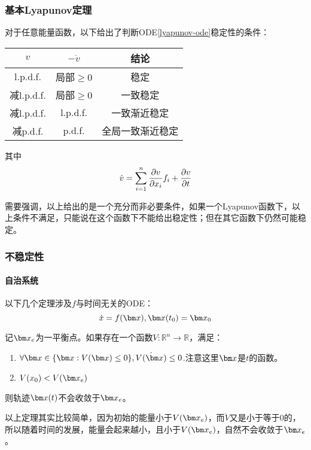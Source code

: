 \subsubsection{基本Lyapunov定理}
\begin{theorem}[基本Lyapunov定理]
对于任意能量函数，以下给出了判断ODE\eqref{lyapunov-ode}稳定性的条件：
\begin{longtable}{|c|c|c|}
\hline
$v$ & $-\dot{v}$ & \textbf{结论}\\
\hline
l.p.d.f. & 局部$\geq 0$ &稳定\\
减l.p.d.f. & 局部$\geq 0$ & 一致稳定\\
减l.p.d.f. & l.p.d.f. & 一致渐近稳定\\
减p.d.f. & p.d.f. &全局一致渐近稳定\\
\hline 
\end{longtable}

其中
$$\dot{v}=\sum_{i=1}^n\pdv{v}{x_i}f_i+\pdv{v}{t}$$

需要强调，以上给出的是一个充分而非必要条件，如果一个Lyapunov函数下，以上条件不满足，只能说在这个函数下不能给出稳定性；但在其它函数下仍然可能稳定。
\end{theorem}

\subsubsection{不稳定性}
\paragraph*{自治系统}以下几个定理涉及$f$与时间无关的ODE：
\begin{equation}
\dot{x}=f(\bx),\bx(t_0)=\bx_0
\end{equation}

\begin{theorem}[Lyapunov不稳定性定理]
记$\bx_e$为一平衡点。如果存在一个函数$V:\mathbb{R}^n\rightarrow \mathbb{R}$，满足：
\begin{enumerate}
\item $\forall \bx\in\{\bx:V(\bx)\leq 0\}, \dot{V(\bx)}\leq 0$.注意这里$\bx$是$t$的函数。
\item $V(x_0)< V(\bx_e)$
\end{enumerate}
则轨迹$\bx(t)$不会收敛于$\bx_e$。
\end{theorem}

以上定理其实比较简单，因为初始的能量小于$V(\bx_e)$，而$\dot{V}$又是小于等于0的，所以随着时间的发展，能量会起来越小，且小于$V(\bx_e)$，自然不会收敛于$\bx_e$。

